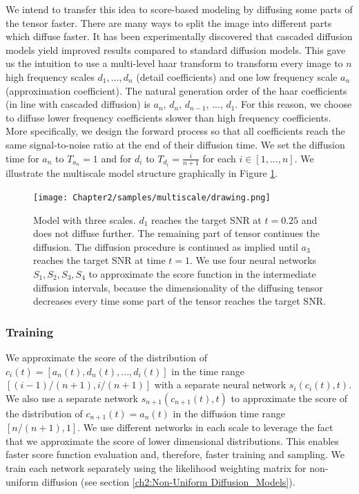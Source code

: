 We intend to transfer this idea to score-based modeling by diffusing some parts of the tensor faster. There are many ways to split the image into different parts which diffuse faster. It has been experimentally discovered that cascaded diffusion models \cite{saharia2021sr3} yield improved results  compared to standard diffusion models. This gave us the intuition to use a multi-level haar transform to transform every image to $n$ high frequency scales $d_1,...,d_n$ (detail coefficients) and one low frequency scale $a_n$ (approximation coefficient). The natural generation order of the haar coefficients (in line with cascaded diffusion) is $a_n$, $d_n$, $d_{n-1}$, ..., $d_1$. For this reason, we choose to diffuse lower frequency coefficients slower than high frequency coefficients. More specifically, we design the forward process so that all coefficients reach the same signal-to-noise ratio at the end of their diffusion time. We set the diffusion time for $a_n$ to $T_{a_n}=1$ and for $d_i$ to $T_{d_i}=\frac{i}{n+1}$ for each $i\in [1,...,n]$. We illustrate the multiscale model structure graphically in Figure \ref{ch2:fig:Multiscale_model}.

\begin{figure}[h]
    \centering
    \texttt{[image: Chapter2/samples/multiscale/drawing.png]}
    \caption{Model with three scales. $d_1$ reaches the target SNR at $t=0.25$ and does not diffuse further. The remaining part of tensor continues the diffusion. The diffusion procedure is continued as implied until $a_3$ reaches the target SNR at time $t=1$. We use four neural networks $S_1, S_2, S_3, S_4$ to approximate the score function in the intermediate diffusion intervals, because the dimensionality of the diffusing tensor decreases every time some part of the tensor reaches the target SNR.}
    \label{ch2:fig:Multiscale_model}
\end{figure}

\subsubsection{Training}
We approximate the score of the distribution of $c_i(t) = [a_n(t), d_n(t),...,d_i(t)]$ in the time range $[(i-1)/(n+1), i/(n+1)]$ with a separate neural network $s_i(c_i(t), t)$. We also use a separate network $s_{n+1}(c_{n+1}(t), t)$ to approximate the score of the distribution of $c_{n+1}(t)=a_n(t)$ in the diffusion time range $[n/(n+1), 1]$. We use different networks in each scale to leverage the fact that we approximate the score of lower dimensional distributions. This enables faster score function evaluation and, therefore, faster training and sampling. We train each network separately using the likelihood weighting matrix for non-uniform diffusion (see section \ref{ch2:Non-Uniform Diffusion_Models}).

